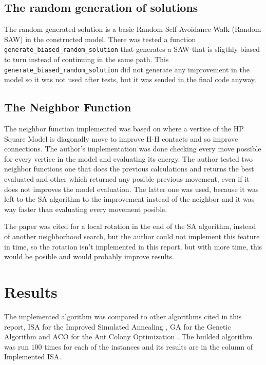 \documentclass[10pt]{article}
\begin{document}
\subsection{The random generation of solutions}

The random generated solution is a basic Random Self Avoidance Walk (Random SAW) in the constructed model. There was tested a function \verb|generate_biased_random_solution| that generates a SAW that is sligthly biased to turn instead of continuing in the same path. This \verb|generate_biased_random_solution| did not generate any improvement in the model so it was not used after tests, but it was sended in the final code anyway.

\subsection{The Neighbor Function}

The neighbor function implemented was based on \cite{LocalMoveSet} where a vertice of the HP Square Model is diagonally move to improve H-H contacts and so improve connections. The author's implementation was done checking every move possible for every vertice in the model and evaluating its energy. The author tested two neighbor functions one that does the previous calculations and returns the best evaluated and other which returned any posible previous movement, even if it does not improves the model evaluation. The latter one was used, because it was left to the SA algorithm to the improvement instead of the neighbor and it was way faster than evaluating every movement posible.

The paper \cite{LocalRotation} was cited for a local rotation in the end of the SA algorithm, instead of another neighborhood search, but the author could not implement this feature in time, so the rotation isn't implemented in this report, but with more time, this would be posible and would probably improve results.

\section{Results}\label{sec:3}

The implemented algorithm was compared to other algorithms cited in this report, ISA for the Improved Simulated Annealing \cite{SaInPFP}, GA for the Genetic Algorithm \cite{GA} and ACO for the Ant Colony Optimization \cite{ACO}. The builded algorithm was run $100$ times for each of the instances and its results are in the column of Implemented ISA. 
\end{document}
